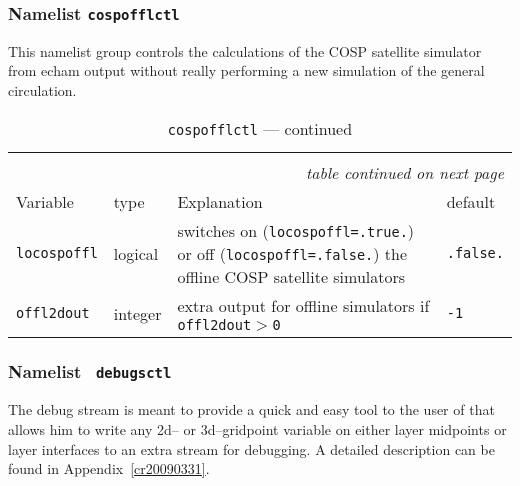 \subsubsection{Namelist {\tt cospofflctl}}\label{seccospofflctl}

This namelist group controls the calculations of the COSP satellite
simulator from echam output without really performing a new simulation
of the general circulation.

\setlength{\LTcapwidth}{\textwidth}
\setlength{\LTleft}{0pt}\setlength{\LTright}{0pt}

\begin{longtable}{l@{\extracolsep\fill}lp{5.0cm}p{3.0cm}}
\hline\hline\caption[Namelist {\tt cospofflctl}]{Namelist
  {\tt cospofflctl}}\\\hline\label{tabcospofflctl}
\endfirsthead
\caption[]{{\tt cospofflctl} --- continued}\\\hline
\endhead
\hline\multicolumn{4}{r}{\slshape table continued on next page}\\
\endfoot
\hline %
\endlastfoot
Variable & type & Explanation & default \\\hline
{\tt locospoffl}\index{namelist variables!locospoffl}
 & logical & switches on ({\tt locospoffl=.true.}) or off
({\tt locospoffl=.false.}) the offline COSP satellite simulators &
{\tt .false.}\\ 
{\tt offl2dout}\index{namelist variables!offl2dout}
 & integer & extra output for offline simulators if {\tt
  offl2dout$>$0} 
& {\tt -1} \\
\hline 
\end{longtable}


\subsubsection{Namelist {\tt
    debugsctl}}\label{secdebugsctl} 

The debug stream is meant to provide a quick and easy tool to the user of
\echam{} that allows him to write any 2d-- or 3d--gridpoint variable
on either layer midpoints or layer interfaces
to an extra stream for debugging. A detailed description can be found
in Appendix~\ref{cr20090331}.


\setlength{\LTcapwidth}{\textwidth}
\setlength{\LTleft}{0pt}\setlength{\LTright}{0pt}

